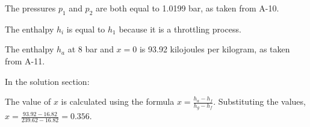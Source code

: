 The pressures \( p_1 \) and \( p_2 \) are both equal to 1.0199 bar, as taken from A-10.

The enthalpy \( h_i \) is equal to \( h_1 \) because it is a throttling process.

The enthalpy \( h_a \) at 8 bar and \( x = 0 \) is 93.92 kilojoules per kilogram, as taken from A-11.

In the solution section:

The value of \( x \) is calculated using the formula \( x = \frac{h_a - h_f}{h_g - h_f} \). Substituting the values, \( x = \frac{93.92 - 16.82}{239.62 - 16.82} = 0.356 \).